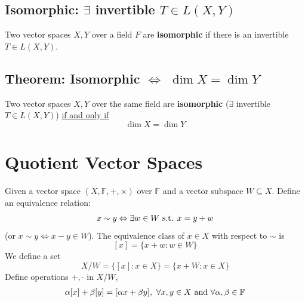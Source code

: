 \documentclass[11pt]{elegantbook}
\begin{document}
\subsection{Isomorphic: $\exists$ invertible $T \in L(X, Y)$}
\begin{definition}[Isomorphisms]
    \normalfont
    Two vector spaces $X, Y$ over a field $F$ are \textbf{isomorphic} if there is an invertible $T \in L(X, Y)$.
\end{definition}

\subsection{Theorem: Isomorphic $\Leftrightarrow$ $\dim X = \dim Y$}
\begin{theorem}[Isomorphic $\Leftrightarrow$ $\dim X = \dim Y$]
    Two vector spaces $X, Y$ over the same field are \textbf{isomorphic} ($\exists$ invertible $T \in L(X, Y)$) \underline{if and only if} $$\dim X = \dim Y$$
\end{theorem}


\section{Quotient Vector Spaces}
Given a vector space $(X,\mathbb{F},+,\times)$ over $\mathbb{F}$ and a vector subspace $W\subseteq X$. Define an equivalence relation: $$x\sim y \Leftrightarrow \exists w\in W \textnormal{ s.t. }x=y+w$$
(or $x\sim y \Leftrightarrow x-y\in W$). The equivalence class of $x\in X$ with respect to $\sim$ is $$[x]=\{x+w:w\in W\}$$
We define a set $$X/W=\{[x]:x\in X\}=\{x+W:x\in X\}$$
Define operations $+,\cdot$ in $X/W$,
\begin{equation}
    \begin{aligned}
        \alpha[x]+\beta[y]=[\alpha x +\beta y],\ \forall x,y\in X \textnormal{ and }\forall \alpha,\beta\in \mathbb{F}
    \end{aligned}
    \nonumber
\end{equation}
\end{document}
